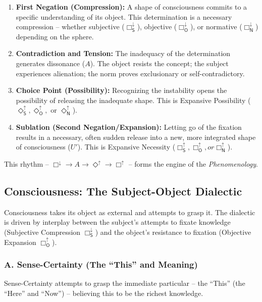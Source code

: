 \documentclass[12pt]{book}
\newcommand{\SBoxUp}{\Box_{\mathsf{S}}^{\uparrow}}
\newcommand{\SBoxDown}{\Box_{\mathsf{S}}^{\downarrow}}
\newcommand{\SDiaUp}{\Diamond_{\mathsf{S}}^{\uparrow}}
\newcommand{\OBoxUp}{\Box_{\mathsf{O}}^{\uparrow}}
\newcommand{\OBoxDown}{\Box_{\mathsf{O}}^{\downarrow}}
\newcommand{\ODiaUp}{\Diamond_{\mathsf{O}}^{\uparrow}}
\newcommand{\NBoxUp}{\Box_{\mathsf{N}}^{\uparrow}}
\newcommand{\NBoxDown}{\Box_{\mathsf{N}}^{\downarrow}}
\newcommand{\NDiaUp}{\Diamond_{\mathsf{N}}^{\uparrow}}
\begin{document}
\begin{enumerate}
\item \textbf{First Negation (Compression):} A shape of consciousness commits to a specific understanding of its object. This determination is a necessary compression -- whether subjective ($\SBoxDown$), objective ($\OBoxDown$), or normative ($\NBoxDown$) depending on the sphere.

\item \textbf{Contradiction and Tension:} The inadequacy of the determination generates dissonance ($A$). The object resists the concept; the subject experiences alienation; the norm proves exclusionary or self-contradictory.

\item \textbf{Choice Point (Possibility):} Recognizing the instability opens the possibility of releasing the inadequate shape. This is Expansive Possibility ($\SDiaUp, \ODiaUp,$ or $\NDiaUp$).

\item \textbf{Sublation (Second Negation/Expansion):} Letting go of the fixation results in a necessary, often sudden release into a new, more integrated shape of consciousness ($U'$). This is Expansive Necessity ($\SBoxUp, \OBoxUp, or \NBoxUp$).
\end{enumerate}

This rhythm -- $\Box^{\downarrow} \rightarrow A \rightarrow \Diamond^{\uparrow} \rightarrow \Box^{\uparrow}$ -- forms the engine of the \emph{Phenomenology}.

\subsection{Consciousness: The Subject-Object Dialectic}

Consciousness takes its object as external and attempts to grasp it. The dialectic is driven by interplay between the subject's attempts to fixate knowledge (Subjective Compression $\SBoxDown$) and the object's resistance to fixation (Objective Expansion $\OBoxUp$).

\subsubsection{A. Sense-Certainty (The ``This'' and Meaning)}

Sense-Certainty attempts to grasp the immediate particular -- the ``This'' (the ``Here'' and ``Now'') -- believing this to be the richest knowledge.
\end{document}
